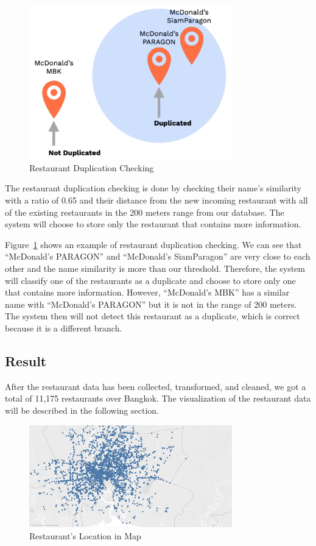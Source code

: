 \documentclass[12pt,oneside,openright,a4paper]{cpe-english-project}
\begin{document}
\newpage
\begin{figure}[H]\centering
\includegraphics[width=250pt]{./images/4RestaurantDuplicationChecking.png}
\caption{Restaurant Duplication Checking}\label{fig:4RestaurantDuplicationChecking}
\end{figure}\vspace{-24pt}

The restaurant duplication checking is done by checking their name’s similarity with a ratio of 0.65 and their distance from the new incoming restaurant with all of the existing restaurants in the 200 meters range from our database. The system will choose to store only the restaurant that contains more information.

Figure~\ref{fig:4RestaurantDuplicationChecking} shows an example of restaurant duplication checking. We can see that “McDonald’s PARAGON” and “McDonald’s SiamParagon” are very close to each other and the name similarity is more than our threshold. Therefore, the system will classify one of the restaurants as a duplicate and choose to store only one that contains more information. However, “McDonald’s MBK” has a similar name with “McDonald’s PARAGON” but it is not in the range of 200 meters. The system then will not detect this restaurant as a duplicate, which is correct because it is a different branch.

\subsection{Result}

After the restaurant data has been collected, transformed, and cleaned, we got a total of 11,175 restaurants over Bangkok. The visualization of the restaurant data will be described in the following section.

\begin{figure}[H]\centering
\includegraphics[width=250pt]{./images/4RestaurantsLocationinMap.png}
\caption{Restaurant’s Location in Map}\label{fig:4RestaurantsLocationinMap}
\end{figure}\vspace{-24pt}
\end{document}
